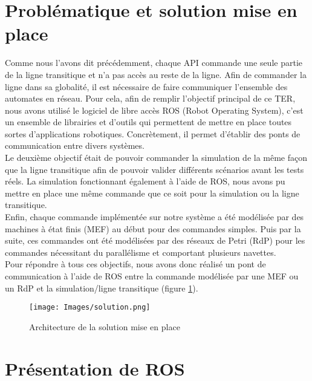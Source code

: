 \documentclass[a4paper,french, titlepage]{book}
\begin{document}
\section{Problématique et solution mise en place}

Comme nous l'avons dit précédemment, chaque API commande une seule partie de la ligne transitique et n'a pas accès au reste de la ligne. Afin de commander la ligne dans sa globalité, il est nécessaire de faire communiquer l'ensemble des automates en réseau. Pour cela, afin de remplir l'objectif principal de ce TER, nous avons utilisé le logiciel de libre accès ROS (Robot Operating System), c'est un ensemble de librairies et d'outils qui permettent de mettre en place toutes sortes d'applications robotiques. Concrètement, il permet d'établir des ponts de communication entre divers systèmes.\\

Le deuxième objectif était de pouvoir commander la simulation de la même façon que la ligne transitique afin de pouvoir valider différents scénarios avant les tests réels. La simulation fonctionnant également à l'aide de ROS,
nous avons pu mettre en place une même commande que ce soit pour la simulation ou la ligne transitique.\\

Enfin, chaque commande implémentée sur notre système a été modélisée par des machines à état finis (MEF) au début pour des commandes simples. Puis par la suite, ces commandes ont été modélisées par des réseaux de Petri (RdP) pour les commandes nécessitant du parallélisme et comportant plusieurs navettes.\\

Pour répondre à tous ces objectifs, nous avons donc réalisé un pont de communication à l'aide de ROS entre la commande modélisée par une MEF ou un RdP et la simulation/ligne transitique (figure \ref{schema_solution}).

\begin{figure}[H] 
\begin{center}
\texttt{[image: Images/solution.png]} 
\end{center}
\caption{Architecture de la solution mise en place}
\label{schema_solution}
\end{figure} 



\section{Présentation de ROS\label{section_pre_ros}}
\end{document}
